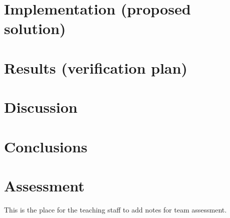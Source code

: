 \documentclass[%
	a4paper,
]
{article}
\begin{document}


%
%
\section{Implementation (proposed solution)}
\label{sec:solution}




%
%
\section{Results (verification plan)}
\label{sec:results}




%
%
\section{Discussion}
\label{sec:discussion}


%
%
\section{Conclusions}
\label{sec:conclusions}

%
%
\pagebreak
\section{Assessment}
\label{sec:assessment}

This is the place for the teaching staff to add notes for team assessment.
\end{document}
